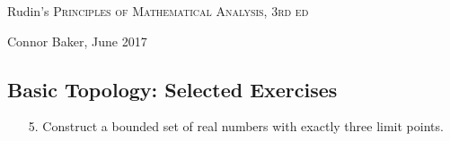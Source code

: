\documentclass[10pt]{article}
\theoremstyle{definition}
\theoremstyle{plain}
\begin{document}

\begin{center}
  {\Large Rudin's \textsc{Principles of Mathematical Analysis, 3rd ed}}

  {\large Connor Baker, June 2017}

  \subsection*{Basic Topology: Selected Exercises}
\end{center}
\begin{enumerate}
\item[5.] Construct a bounded set of real numbers with exactly three limit points.
\end{enumerate}
\end{document}
